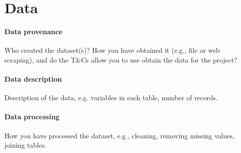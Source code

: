 \section{Data}

    \paragraph{Data provenance}
        Who created the dataset(s)?
        How you have obtained it (e.g., file or web scraping), and do the T\&Cs allow
            you to use obtain the data for the project?

    \paragraph{Data description}
        Description of the data, e.g. variables in each table, number of records.

    \paragraph{Data processing}
        How you have processed the dataset, e.g., cleaning, removing missing values,
            joining tables.
